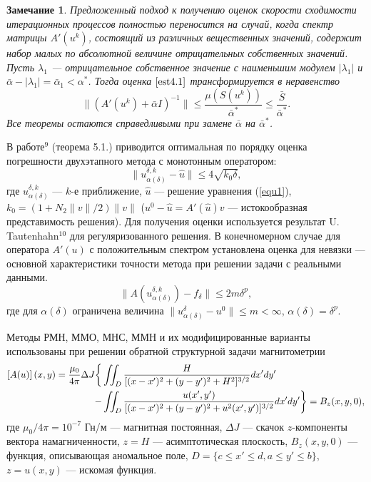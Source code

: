 \documentclass[%
autoref,     %
href,        %
facsimile,   %
colorlinks,  %
]{disser}
\newtheorem{remark}{Замечание}
\begin{document}
\begin{remark}
	Предложенный подход к получению оценок скорости сходимости итерационных процессов полностью переносится на случай, когда спектр матрицы $A'(u^k)$, состоящий из различных вещественных значений, содержит набор малых по абсолютной величине отрицательных собственных значений. Пусть $\lambda _1$ --- отрицательное собственное значение с наименьшим модулем $|\lambda_1|$ и $\bar\alpha -|\lambda _1|=\bar\alpha _1<\alpha^*$. Тогда оценка $\eqref{est4.1}$ 
	трансформируется в неравенство
	$$\|(A'(u^k)+\bar\alpha I)^{-1}\|\leqslant\frac{\mu(S(u^k))}{\bar\alpha^*}\leqslant\frac{\bar S}{\bar\alpha^*}.$$
	Все теоремы остаются справедливыми при замене $\bar\alpha$ на $\bar\alpha^*$.
\end{remark}

В работе$^9$ (теорема 5.1.) приводится оптимальная по порядку оценка погрешности двухэтапного метода с монотонным оператором:
\begin{equation*}
\|u_{\alpha(\delta)}^{\delta, k}-\hat{u}\|\leqslant 4\sqrt{k_0 \delta},
\end{equation*}
где $u_{\alpha(\delta)}^{\delta, k}$ --- $k$-е приближение, $\hat{u}$ --- решение уравнения (\ref{equ1}), $k_0=(1+N_2\|v\|/2)\|v\|$ ($u^0-\hat{u}=A'(\hat{u})v$ --- истокообразная представимость решения). Для получения оценки используется результат U. Tautenhahn$^{10}$ для регуляризованного решения.
В конечномерном случае для оператора $A'(u)$ с положительным спектром установлена оценка для невязки --- основной характеристики точности метода при решении задачи с реальными данными.
$$\|A(u_{\alpha(\delta)}^{\delta,k})-f_\delta\|\leqslant 2m\delta^p,$$
где для $\alpha(\delta)$ ограничена величина $\|u_{\alpha(\delta)}^{\delta}-u^0\|\leqslant m <\infty$, $\alpha(\delta)=\delta^p$. 
{\scriptsize
\let\thefootnote\relax\let\thefootnote\relax{}
\let\thefootnote\relax\let\thefootnote\relax{}
}

 Методы РМН, ММО, МНС, ММН и их модифицированные варианты использованы при решении обратной структурной задачи магнитометрии
\begin{equation*}\begin{aligned}
\left[A(u)\right](x,y)=\frac{\mu_0}{4\pi}\Delta J  \bigg\{&\iint_{D} \frac{H}{[(x-x')^2+(y-y')^2+H^2]^{3/2}}dx'dy' \notag\\
- &\iint_{D} \frac{u(x',y')}{[(x-x')^2+(y-y')^2+u^2(x',y')]^{3/2}}dx'dy' \bigg\}= B_z(x,y,0),
\end{aligned} \end{equation*}
где $\mu_0/{4\pi}=10^{-7}$ Гн/м --- магнитная постоянная, $\Delta J$ --- скачок $z$-компоненты вектора намагниченности, $z=H$ --- асимптотическая плоскость, $ B_z(x,y,0)$ --- функция, описывающая  аномальное поле, $D=\{c\leqslant x' \leqslant d, a\leqslant y' \leqslant b\}$, $z=u(x,y)$ --- искомая функция.
\end{document}
